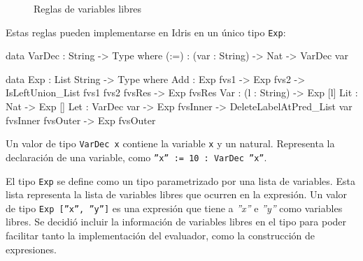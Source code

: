 \begin{figure}[h]

\centering

\begin{subfigure}{0.5\linewidth}
\centering
{}
\end{subfigure}%

\bigskip

\begin{subfigure}{0.5\linewidth}
\centering
{}
\end{subfigure}%

\bigskip

\begin{subfigure}{0.5\linewidth}
\centering
{}
\end{subfigure}%

\bigskip

\begin{subfigure}{0.5\linewidth}
\centering
{}
\end{subfigure}%

\caption{Reglas de variables libres}
\label{fig:RulesFreeVariables}
\end{figure}

Estas reglas pueden implementarse en Idris en un único tipo \texttt{Exp}:

\begin{code}
data VarDec : String -> Type where
  (:=) : (var : String) -> Nat -> VarDec var

data Exp : List String -> Type where
  Add : Exp fvs1 -> Exp fvs2 ->
    IsLeftUnion_List fvs1 fvs2 fvsRes ->
    Exp fvsRes
  Var : (l : String) -> Exp [l]
  Lit : Nat -> Exp []
  Let : VarDec var -> Exp fvsInner ->
    DeleteLabelAtPred_List var fvsInner fvsOuter ->
    Exp fvsOuter
\end{code}

Un valor de tipo \texttt{VarDec x} contiene la variable \texttt{x} y un natural. Representa la declaración de una variable, como \texttt{''x'' := 10 : VarDec ''x''}.

El tipo \texttt{Exp} se define como un tipo parametrizado por una lista de variables. Esta lista representa la lista de variables libres que ocurren en la expresión. Un valor de tipo \texttt{Exp [''x'', ''y'']} es una expresión que tiene a \textit{''x''} e \textit{''y''} como variables libres. Se decidió incluir la información de variables libres en el tipo para poder facilitar tanto la implementación del evaluador, como la construcción de expresiones.

